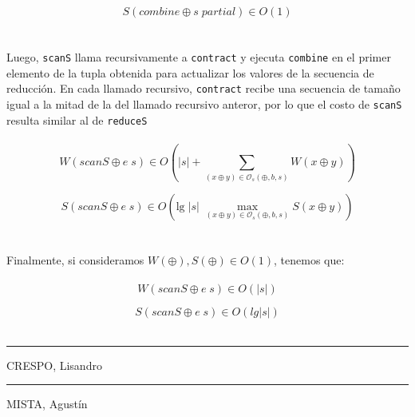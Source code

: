 \documentclass[a4paper,10pt]{article}
\begin{document}
		\begin{equation*}
			S \left( combine \oplus s \; partial \right) \in O \left( 1 \right)
		\end{equation*}
\\
\\	
		Luego, \texttt{scanS} llama recursivamente a \texttt{contract} y ejecuta \texttt{combine} en el primer elemento de la tupla obtenida para actualizar los valores de la secuencia de reducción.
		En cada llamado recursivo, \texttt{contract} recibe una secuencia de tamaño igual a la mitad de la del llamado recursivo anteror, por lo que el costo de \texttt{scanS} resulta similar al de \texttt{reduceS}
\\
\\
		\begin{equation*}
			W \left( scanS \oplus e \; s \right) \in
			O \left( \vert s \vert + \sum_{(x \oplus y) \in \mathcal{O}_s(\oplus,b,s)} W \left( x \oplus y \right) \right)
		\end{equation*}

		\begin{equation*}
			S \left( scanS \oplus e \; s \right) \in
			O \left( \text{lg} \; \vert s \vert \; \max_{(x \oplus y) \in \mathcal{O}_s(\oplus,b,s)} S \left( x \oplus y \right) \right)
		\end{equation*}
\\
\\		
		Finalmente, si consideramos $W(\oplus), S(\oplus) \in O(1)$, tenemos que:
\\
\\		
		\begin{equation*}
			W \left( scanS \oplus e \; s  \right) \in O \left( \vert s \vert \right)
		\end{equation*}
		
		\begin{equation*}
			S \left( scanS \oplus e \; s  \right) \in O \left( lg\vert s \vert \right)
		\end{equation*}
\pagebreak
\\
\vspace{\fill}
\begin{multicols}{2}
	\hrule
	\vspace{5pt}
	CRESPO, Lisandro \\
	\linebreak

	\hrule
	\vspace{5pt}
	MISTA, Agustín \\
\end{multicols}
\end{document}

